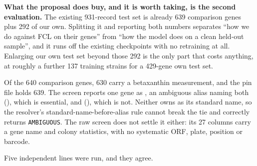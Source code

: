 \textbf{What the proposal does buy, and it is worth taking, is the second evaluation.} The
existing 931-record test set is already 639 comparison genes plus 292 of our own. Splitting
it and reporting both numbers separates ``how we do against FCL on their genes'' from ``how
the model does on a clean held-out sample'', and it runs off the existing 
checkpoints with no retraining at all. Enlarging our own test set beyond those 292 is the
only part that costs anything, at roughly a further 137 training strains for a 429-gene own
test set.

 Of the 640 comparison
genes, 630 carry a betaxanthin measurement, and the pin file holds 639. The screen reports
one gene as , an ambiguous alias naming both  (), which
is essential, and  (), which is not. Neither owns  as
its standard name, so the resolver's standard-name-before-alias rule cannot break the tie and
correctly returns \texttt{AMBIGUOUS}. The raw screen does not settle it either: its 27
columns carry a gene name and colony statistics, with no systematic ORF, plate, position or
barcode.

Five independent lines were run, and they agree.

